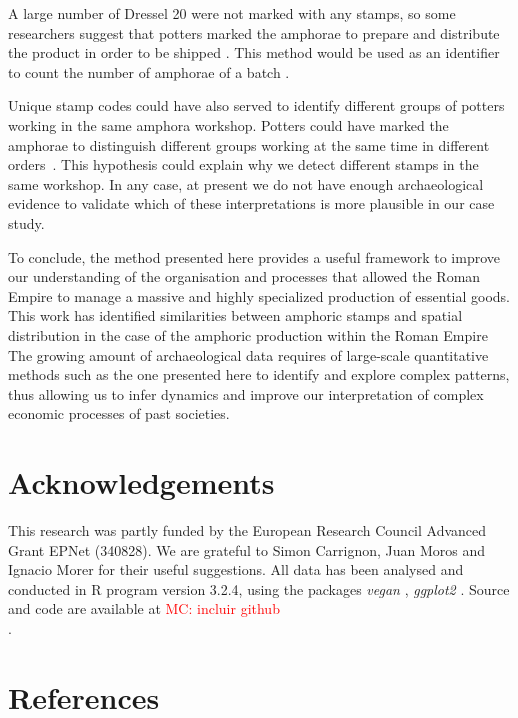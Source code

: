 \documentclass[review]{elsarticle}
\newcommand{\memo}[2]{\textcolor{#1}{#2}}
\newcommand{\maria}[1]{\memo{red}{MC: #1\\}}
\newcommand{\xavi}[1]{\memo{magenta}{XRC: #1\\}}
\begin{document}


A large number of Dressel 20 were not marked with any stamps, so some researchers suggest that potters marked the amphorae to prepare and distribute the product in order to be shipped \citep{berni_millet_epigrafianforica_2008}. This method would be used as an identifier to count the number of amphorae of a batch \citep{juanmorostesis}. 

Unique stamp codes could have also served to identify different groups of potters working in the same amphora workshop. Potters could have marked the amphorae to distinguish different groups working at the same time in different orders~\citep{li_crossbows_2014}. This hypothesis could explain why we detect different stamps in the same workshop. In any case, at present we do not have enough archaeological evidence to validate which of these interpretations is more plausible in our case study.

To conclude, the method presented here provides a useful framework to improve our understanding of the organisation and processes that allowed the Roman Empire to manage a massive and highly specialized production of essential goods. This work has identified similarities between amphoric stamps and spatial distribution in the case of the amphoric production within the Roman Empire
The growing amount of archaeological data requires of large-scale quantitative methods such as the one presented here to identify and explore complex patterns, thus allowing us to infer dynamics and improve our interpretation of complex economic processes of past societies. 

\section{Acknowledgements}

This research was partly funded by the European Research Council Advanced Grant EPNet (340828). We are grateful to Simon Carrignon, Juan Moros and Ignacio Morer for their useful suggestions.  
All data has been analysed and conducted in R program version 3.2.4, using the packages \textit{vegan} \citep{oksanen_vegan_2007}, \textit{ggplot2} \citep{ggplot2:_2016}. Source and code are available at \maria{incluir github}. 

\section{References}

%

\end{document}
